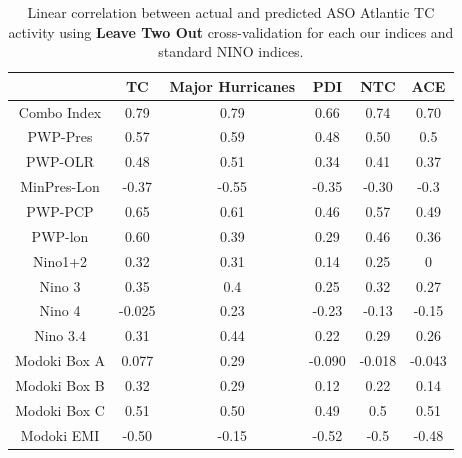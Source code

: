 \documentclass[]{article}
\begin{document}
\begin{table}
\begin{tabular}{cccccc}
\hline
& TC & Major Hurricanes & PDI & NTC & ACE\\
\hline
Combo Index & 0.79 & 0.79 & 0.66 & 0.74 & 0.70\\
PWP-Pres & 0.57 & 0.59 & 0.48 & 0.50 & 0.5\\
PWP-OLR & 0.48 & 0.51 & 0.34 & 0.41 & 0.37\\
MinPres-Lon & -0.37 & -0.55 & -0.35 & -0.30 & -0.3\\
PWP-PCP & 0.65 & 0.61 & 0.46 & 0.57 & 0.49\\
PWP-lon & 0.60 & 0.39 & 0.29 & 0.46 & 0.36\\
Nino1+2 & 0.32 & 0.31 & 0.14 & 0.25 & 0\\
Nino 3 & 0.35 & 0.4 & 0.25 & 0.32 & 0.27\\
Nino 4 & -0.025 & 0.23 & -0.23 & -0.13 & -0.15\\
Nino 3.4 & 0.31 & 0.44 & 0.22 & 0.29 & 0.26\\
Modoki Box A & 0.077 & 0.29 & -0.090 & -0.018 & -0.043\\
Modoki Box B & 0.32 & 0.29 & 0.12 & 0.22 & 0.14\\
Modoki Box C & 0.51 & 0.50 & 0.49 & 0.5 & 0.51\\
Modoki EMI & -0.50 & -0.15 & -0.52 & -0.5 & -0.48\\
\hline
\end{tabular}
\caption{Linear correlation between actual and predicted ASO Atlantic TC activity using \textbf{Leave Two Out} cross-validation for each our indices and standard NINO indices.}
\label{ref:l2o_corr}
\end{table}
\end{document}
